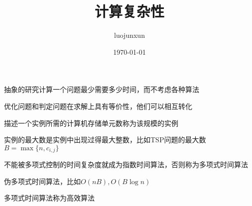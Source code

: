 \documentclass[12pt, a4paper, oneside]{ctexart}
\title{\huge\textbf{计算复杂性}}
\author{luojunxun}
\date{\today}
\begin{document}
\maketitle

抽象的研究计算一个问题最少需要多少时间，而不考虑各种算法

优化问题和判定问题在求解上具有等价性，他们可以相互转化

描述一个实例所需的计算机存储单元数称为该规模的实例

实例的最大数是实例中出现过得最大整数，比如TSP问题的最大数$B=\max \{n,c_{i,j}\}$

不能被多项式控制的时间复杂度就成为指数时间算法，否则称为多项式时间算法

伪多项式时间算法，比如$O(nB),O(B\log n) $

多项式时间算法称为高效算法



















% 
% 
\end{document}
